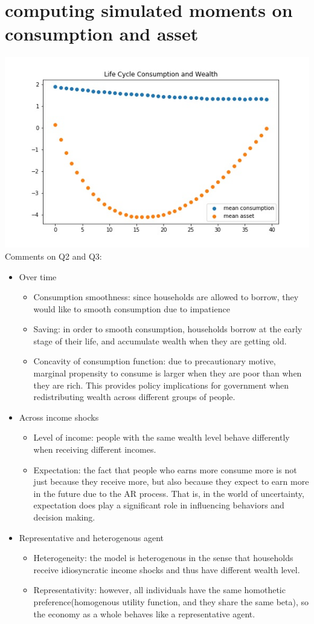 \documentclass[]{article}
\begin{document}
\section{computing simulated moments on consumption and asset}
\includegraphics[width=\linewidth]{LifeCycle.jpg}
Comments on Q2 and Q3:
\begin{itemize}
	\item Over time
	\begin{itemize}
		\item Consumption smoothness: since households are allowed to borrow, they would like to smooth consumption due to impatience
		\item Saving: in order to smooth consumption, households borrow at the early stage of their life, and accumulate wealth when they are getting old. 
		\item Concavity of consumption function: due to precautionary motive, marginal propensity to consume is larger when they are poor than when they are rich. This provides policy implications for government when redistributing wealth across different groups of people. 
	\end{itemize}
	\item Across income shocks
	\begin{itemize}
		\item Level of income: people with the same wealth level behave differently when receiving different incomes. 
		\item Expectation: the fact that people who earns more consume more is not just because they receive more, but also because they expect to earn more in the future due to the AR process. That is, in the world of uncertainty, expectation does play a significant role in influencing behaviors and decision making.
	\end{itemize}
	\item Representative and heterogenous agent
	\begin{itemize}
		\item Heterogeneity: the model is heterogenous in the sense that households receive idiosyncratic income shocks and thus have different wealth level.
		\item  Representativity: however, all individuals have the same homothetic preference(homogenous utility function, and they share the same beta), so the economy as a whole behaves like a representative agent.
	\end{itemize}
\end{itemize}
\end{document}
